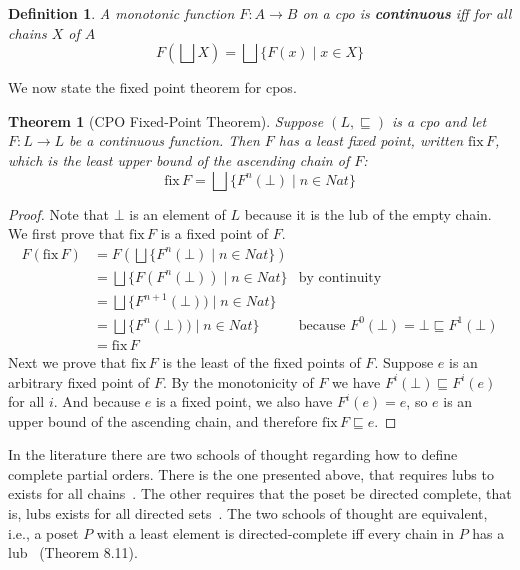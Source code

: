 \documentclass{tufte-handout}
\newcommand{\NAT}[0]{\ensuremath{\mathit{Nat}}}
\newtheorem{theorem}{Theorem}%
\newtheorem{definition}{Definition}%
\begin{document}
\begin{definition}
  A monotonic function $F : A {\to} B$ on a cpo is
  \textbf{\emph{continuous}} iff for all chains $X$ of $A$
  \[
  F(\bigsqcup X) = \bigsqcup \{ F(x) \mid x \in X \}
  \]
\end{definition}

We now state the fixed point theorem for cpos.

\begin{theorem}[CPO Fixed-Point Theorem]\label{thm:fixed-point}
Suppose $(L,\sqsubseteq)$ is a cpo and let $F:L\to L$ be a continuous
function. Then $F$ has a least fixed point, written $\mathrm{fix}\,F$,
which is the least upper bound of the ascending chain of $F$:
\[
  \mathrm{fix}\,F = \bigsqcup \{ F^n(\bot) \mid n \in \mathit{Nat} \}
\]
\end{theorem}
\begin{proof}
Note that $\bot$ is an element of $L$ because it is the lub of the
empty chain.  We first prove that $\mathrm{fix}\,F$ is a fixed point
of $F$.
\begin{align*}
  F(\mathrm{fix}\,F) &= F(\bigsqcup \{ F^n(\bot) \mid n \in \NAT \})\\
  &= \bigsqcup\{ F(F^n(\bot)) \mid n \in \NAT \} & \text{by continuity}\\
  &= \bigsqcup\{ F^{n+1}(\bot)) \mid n \in \NAT \} \\
  &= \bigsqcup\{ F^n(\bot)) \mid n \in \NAT \} 
  & \text{because } F^0(\bot) = \bot \sqsubseteq F^1(\bot)  \\
  &= \mathrm{fix}\,F
\end{align*}
Next we prove that $\mathrm{fix}\,F$ is the least of the fixed points
of $F$. Suppose $e$ is an arbitrary fixed point of $F$. By the
monotonicity of $F$ we have $F^i(\bot) \sqsubseteq F^i(e)$ for all
$i$.  And because $e$ is a fixed point, we also have $F^i(e) = e$, so
$e$ is an upper bound of the ascending chain, and therefore
$\mathrm{fix}\,F \sqsubseteq e$.
\end{proof}


In the literature there are two schools of thought regarding how to
define complete partial orders. There is the one presented above, that
requires lubs to exists for all
chains~\citep{Plotkin:1983aa,Schmidt:1986vn,Winskel:1993uq}.  The
other requires that the poset be directed complete, that is, lubs
exists for all directed
sets~\citep{Gunter:1990aa,Mitchell:1996nn,Amadio:1998fk,Berger:2007aa}.
The two schools of thought are equivalent, i.e., a poset $P$ with a
least element is directed-complete iff every chain in $P$ has a
lub~\citep{Davey:2002fj} (Theorem 8.11).
\end{document}
